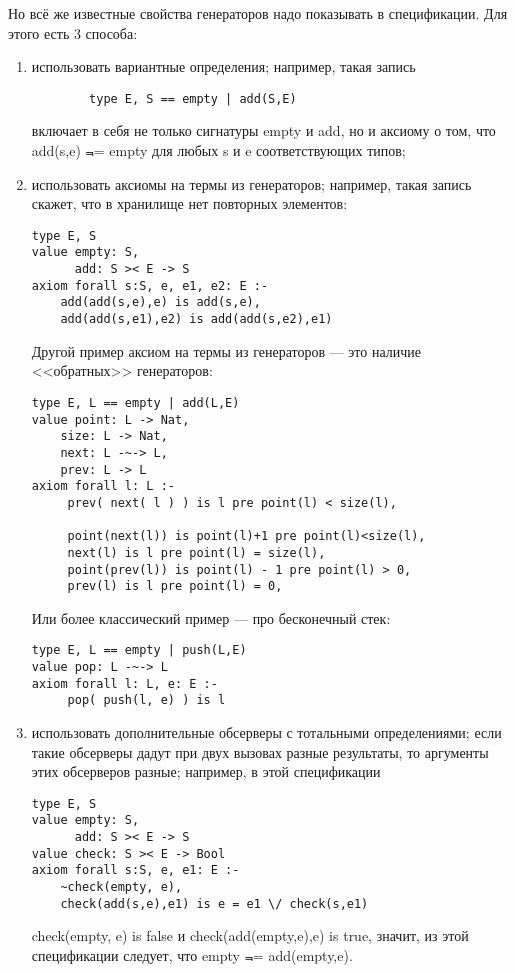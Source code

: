 Но всё же известные свойства генераторов надо показывать в спецификации. Для этого есть 3 способа:
\begin{enumerate}
  \item использовать вариантные определения; например, такая запись
      \begin{lstlisting}
        type E, S == empty | add(S,E)
      \end{lstlisting}
      включает в себя не только сигнатуры empty и add, но и аксиому о том, что add(s,e) $\Not$= empty для любых s и e соответствующих типов;

  \item использовать аксиомы на термы из генераторов; например, такая запись скажет, что в хранилище нет повторных элементов:
\begin{lstlisting}
type E, S
value empty: S,
      add: S >< E -> S
axiom forall s:S, e, e1, e2: E :-
    add(add(s,e),e) is add(s,e),
    add(add(s,e1),e2) is add(add(s,e2),e1)
\end{lstlisting}
     Другой пример аксиом на термы из генераторов --- это наличие <<обратных>> генераторов:
\begin{lstlisting}
type E, L == empty | add(L,E)
value point: L -> Nat,
    size: L -> Nat,
    next: L -~-> L,
    prev: L -> L
axiom forall l: L :-
     prev( next( l ) ) is l pre point(l) < size(l),

     point(next(l)) is point(l)+1 pre point(l)<size(l),
     next(l) is l pre point(l) = size(l),
     point(prev(l)) is point(l) - 1 pre point(l) > 0,
     prev(l) is l pre point(l) = 0,
\end{lstlisting}
Или более классический пример --- про бесконечный стек:
\begin{lstlisting}
type E, L == empty | push(L,E)
value pop: L -~-> L
axiom forall l: L, e: E :-
     pop( push(l, e) ) is l
\end{lstlisting}

   \item использовать дополнительные обсерверы с тотальными определениями; если такие обсерверы дадут при двух вызовах разные результаты, то аргументы этих обсерверов разные; например, в этой спецификации
\begin{lstlisting}
type E, S
value empty: S,
      add: S >< E -> S
value check: S >< E -> Bool
axiom forall s:S, e, e1: E :-
    ~check(empty, e),
    check(add(s,e),e1) is e = e1 \/ check(s,e1)
\end{lstlisting}
    check(empty, e) is false и check(add(empty,e),e) is true, значит, из этой спецификации следует, что empty $\Not$= add(empty,e).
\end{enumerate}

